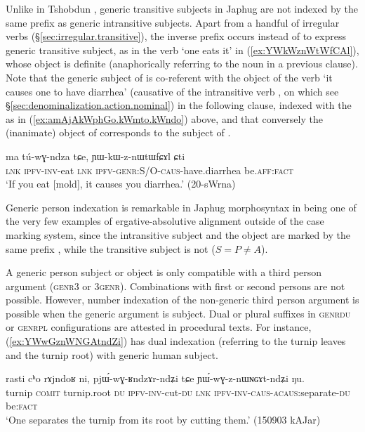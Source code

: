 Unlike in Tshobdun \citep{sun14generic}, generic transitive subjects in Japhug are not indexed by the same prefix as generic intransitive subjects. Apart from a handful of irregular verbs (§\ref{sec:irregular.transitive}), the inverse prefix  occurs instead of  to express generic transitive subject, as in the verb  `one eats it' in (\ref{ex:YWkWznWtWfCAl}), whose object is definite (anaphorically referring to the noun  in a previous clause). Note that the generic subject of  is co-referent with the object of the verb   `it causes one to have diarrhea' (causative of the intransitive verb , on which see §\ref{sec:denominalization.action.nominal}) in the following clause, indexed with the  as in (\ref{ex:amAjAkWphGo.kWmto.kWndo}) above, and that conversely the (inanimate) object of  corresponds to the subject of .

\begin{exe}
\ex   \label{ex:YWkWznWtWfCAl}
\gll  ma tú-wɣ-ndza tɕe, ɲɯ-kɯ-z-nɯtɯfɕɤl ɕti\\
\textsc{lnk} \textsc{ipfv}-\textsc{inv}-eat \textsc{lnk} \textsc{ipfv}-\textsc{genr}:S/O-\textsc{caus}-have.diarrhea be.\textsc{aff}:\textsc{fact}\\
\glt `If you eat [mold], it causes you diarrhea.' (20-sWrna) 
\end{exe}

Generic person indexation is remarkable in Japhug morphosyntax in being one of the very few examples of ergative-absolutive alignment outside of the case marking system, since the intransitive subject and the object are marked by the same prefix , while the transitive subject is not ($S=P \ne A$).

A generic person subject or object is only compatible with a third person argument (\textsc{genr}\fl{}3 or 3\fl{}\textsc{genr}). Combinations with first or second persons are not possible. However, number indexation of the non-generic third person argument is possible when the generic argument is subject. Dual or plural suffixes in \textsc{genr}\fl{}\textsc{du} or \textsc{genr}\fl{}\textsc{pl} configurations are attested in procedural texts. For instance, (\ref{ex:YWwGznWNGAtndZi}) has dual indexation (referring to the turnip leaves and the turnip root) with generic human subject.
\largerpage
\begin{exe}
\ex \label{ex:YWwGznWNGAtndZi}
\gll rasti cʰo rɤjndoʁ ni, pjɯ́-wɣ-ʁndzɤr-ndʑi tɕe ɲɯ́-wɣ-z-nɯɴɢɤt-ndʑi ŋu. \\
turnip \textsc{comit} turnip.root \textsc{du} \textsc{ipfv}-\textsc{inv}-cut-\textsc{du} \textsc{lnk} \textsc{ipfv}-\textsc{inv}-\textsc{caus}-\textsc{acaus}:separate-\textsc{du} be:\textsc{fact}\\
\glt `One separates the turnip from its root by cutting them.' (150903 kAJar)
\end{exe}

